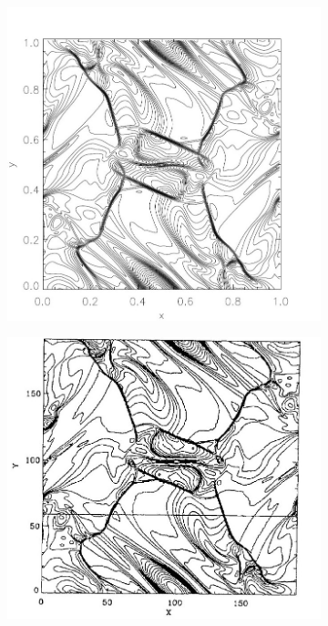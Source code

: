 \begin{figure}[H]
\centering
\begin{subfigure}[b]{0.4\textwidth}\vspace{12mm}\includegraphics[width=\textwidth]{img/ot/ref-londrillo-pressure.jpg}\end{subfigure}
\begin{subfigure}[b]{0.4\textwidth}\includegraphics[width=\textwidth]{img/ot/ref-zachary-pressure-contour.jpg}\end{subfigure}

\end{figure}

